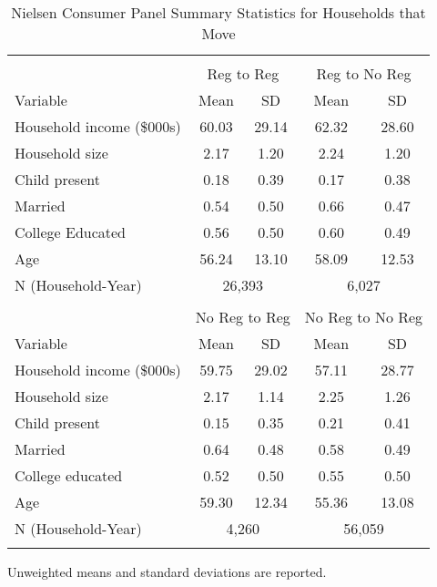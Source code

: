 \begin{table}[!htbp] \centering
\caption{Nielsen Consumer Panel Summary Statistics for Households that Move}
\label{tab:summaryStatsUnitLawsMovers}
\begin{tabular}{lcccc}
\\[-1.8ex]\hline
\hline \\[-1.8ex]
                      & \multicolumn{2}{c}{Reg to Reg} & \multicolumn{2}{c}{Reg to No Reg} \\
Variable                  & Mean  & SD    & Mean  & SD    \\
\hline
Household income (\$000s) & 60.03 & 29.14 & 62.32 & 28.60  \\
Household size            & 2.17  & 1.20  & 2.24  & 1.20   \\
Child present             & 0.18  & 0.39  & 0.17  & 0.38   \\
Married                   & 0.54  & 0.50  & 0.66  & 0.47   \\
College Educated          & 0.56  & 0.50  & 0.60  & 0.49   \\
Age                       & 56.24 & 13.10 & 58.09 & 12.53 \\
\hline
N (Household-Year)        & \multicolumn{2}{c}{26,393} & \multicolumn{2}{c}{6,027} \\
\hline
\hline \\[-1.8ex]
          & \multicolumn{2}{c}{No Reg to Reg}  & \multicolumn{2}{c}{No Reg to No Reg} \\
Variable                  & Mean  & SD    & Mean  & SD \\
\hline
Household income (\$000s) & 59.75 & 29.02  & 57.11 & 28.77 \\
Household size            & 2.17  & 1.14   & 2.25  & 1.26 \\
Child present             & 0.15  & 0.35   & 0.21  & 0.41 \\
Married                   & 0.64  & 0.48   & 0.58  & 0.49 \\
College educated          & 0.52  & 0.50   & 0.55  & 0.50 \\
Age                       & 59.30 & 12.34  & 55.36 & 13.08 \\
\hline
N (Household-Year)        & \multicolumn{2}{c}{4,260} & \multicolumn{2}{c}{56,059} \\
\hline
\hline \\[-1.8ex]
\end{tabular}
\begin{tablenotes}
Unweighted means and standard deviations are reported.
\end{tablenotes}
\end{table}
